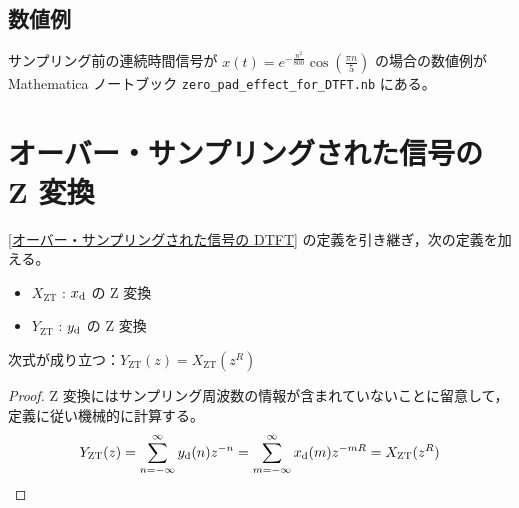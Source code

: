         \subsection{数値例}
            サンプリング前の連続時間信号が $x(t) = e^{-\frac{n^2}{800}}\cos\left(\frac{\pi n}{5}\right)$ の場合の数値例が Mathematica ノートブック \verb|zero_pad_effect_for_DTFT.nb| にある。
    \section{オーバー・サンプリングされた信号の Z 変換}
        \newcommand*{\XZT}{X_\text{ZT}}
        \newcommand*{\YZT}{Y_\text{ZT}}
        \ref{オーバー・サンプリングされた信号の DTFT} の定義を引き継ぎ，次の定義を加える。
        \begin{itemize}
            \item $\XZT$ : $x_\text{d}$ の Z 変換
            \item $\YZT$ : $y_\text{d}$ の Z 変換
        \end{itemize}
        \begin{shadebox}
            次式が成り立つ：$\YZT(z) = \XZT(z^R)$
        \end{shadebox}
        \begin{proof}
            \quad\par
            Z 変換にはサンプリング周波数の情報が含まれていないことに留意して，定義に従い機械的に計算する。
            \[ \YZT(z) = \sum_{n=-\infty}^\infty \yd(n)z^{-n} = \sum_{m=-\infty}^\infty \xd(m)z^{-mR} = \XZT(z^R) \]
        \end{proof}
